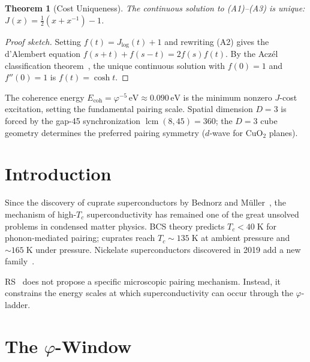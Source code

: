 \documentclass[12pt,a4paper]{article}
\newtheorem{theorem}{Theorem}[section]
\theoremstyle{definition}
\theoremstyle{remark}
\begin{document}
\begin{theorem}[Cost Uniqueness]
\label{thm:unique}
The continuous solution to \textup{(A1)--(A3)} is unique:
$J(x) = \tfrac{1}{2}(x + x^{-1}) - 1$.
\end{theorem}

\begin{proof}[Proof sketch]
Setting $f(t) = J_{\log}(t) + 1$ and rewriting \textup{(A2)} gives the
d'Alembert equation $f(s+t) + f(s-t) = 2f(s)f(t)$.  By the Acz\'el
classification theorem~\cite{Aczel1966}, the unique continuous solution
with $f(0) = 1$ and $f''(0) = 1$ is $f(t) = \cosh t$.
\end{proof}

\noindent The coherence energy $E_{\mathrm{coh}} = \varphi^{-5}\,\mathrm{eV}
\approx 0.090\,\mathrm{eV}$ is the minimum nonzero $J$-cost excitation,
setting the fundamental pairing scale.  Spatial dimension $D = 3$ is
forced by the gap-45 synchronization $\operatorname{lcm}(8,45) = 360$;
the $D = 3$ cube geometry determines the preferred pairing symmetry
($d$-wave for CuO$_2$ planes).

\section{Introduction}
\label{sec:intro}

Since the discovery of cuprate superconductors by Bednorz and
M\"uller~\cite{Bednorz1986}, the mechanism of high-$T_c$
superconductivity has remained one of the great unsolved problems
in condensed matter physics.  BCS theory predicts
$T_c < 40\;\mathrm{K}$ for phonon-mediated pairing; cuprates reach
$T_c \sim 135\;\mathrm{K}$ at ambient pressure and
$\sim 165\;\mathrm{K}$ under pressure.  Nickelate superconductors
discovered in 2019 add a new family~\cite{Li2019}.

RS~\cite{RS_Axioms} does not propose a specific microscopic pairing
mechanism.  Instead, it constrains the energy scales at which
superconductivity can occur through the $\varphi$-ladder.

\section{The $\varphi$-Window}
\label{sec:window}
\end{document}

